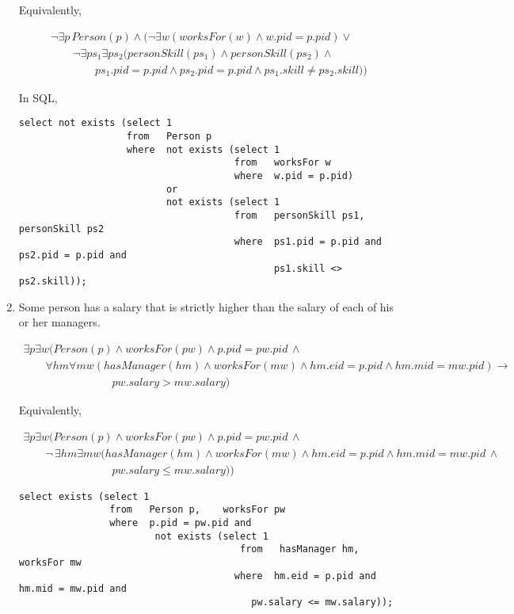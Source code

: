 \documentclass{article}
\begin{document}
\begin{enumerate}[resume]
Equivalently,

$$
\begin{array}{l}
\lnot \exists p\, Person (p) \land (\lnot \exists w (worksFor(w) \land w.pid = p.pid) \lor \\
\qquad  \lnot \exists ps_1\exists ps_2 (personSkill(ps_1)\land personSkill(ps_2) \land \\
\qquad \qquad ps_1.pid = p.pid \land ps_2.pid = p.pid \land ps_1.skill \neq ps_2.skill))
\end{array}
$$

In SQL,

\begin{verbatim}
select not exists (select 1
                   from   Person p
                   where  not exists (select 1
                                      from   worksFor w
                                      where  w.pid = p.pid)
                          or
                          not exists (select 1
                                      from   personSkill ps1, personSkill ps2
                                      where  ps1.pid = p.pid and ps2.pid = p.pid and
                                             ps1.skill <> ps2.skill));
\end{verbatim}


\item  Some person has a salary that is strictly higher than the salary of each of his or her managers.

$$
\begin{array}{l}
\exists p\exists w (Person (p) \land worksFor(pw) \land p.pid = pw.pid \,\land \\
\qquad \forall hm\forall mw (hasManager(hm)\land worksFor(mw) \land hm.eid = p.pid \land hm.mid = mw.pid) \rightarrow \\
\qquad\qquad\qquad\qquad pw.salary > mw.salary)
\end{array}
$$

Equivalently,

$$
\begin{array}{l}
\exists p\exists w (Person (p) \land worksFor(pw) \land p.pid = pw.pid\, \land \\
\qquad \lnot\, \exists hm \exists mw (hasManager(hm)\land worksFor(mw) \land hm.eid = p.pid \land hm.mid = mw.pid\,\land \\
\qquad\qquad\qquad\qquad pw.salary \leq mw.salary))
\end{array}
$$

\begin{verbatim}
select exists (select 1
      	        from   Person p,	worksFor pw
      	        where  p.pid = pw.pid and
      	      	        not exists (select 1
      	      	      	         	   from	  hasManager hm,	worksFor mw
      	      	      	      	      where	 hm.eid	= p.pid and hm.mid = mw.pid and
                                         pw.salary <= mw.salary));
\end{verbatim}



\end{enumerate}
\end{document}
